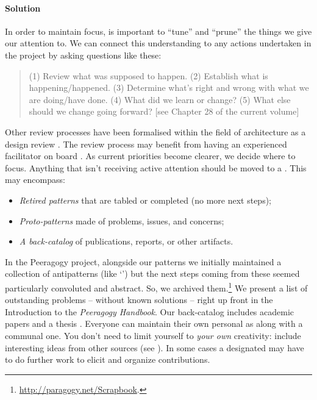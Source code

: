 \begin{refsection}
\paragraph{Solution}
In order to maintain focus, is important to ``tune'' and ``prune'' the
things we give our attention to.  We can connect this understanding to
any actions undertaken in the project by asking questions like these:
\begin{quote}
(1) Review what was supposed to happen.
(2) Establish what is happening/happened.
(3) Determine what’s right and wrong with what we are doing/have done.
(4) What did we learn or change? 
(5) What else should we change going forward?  [see Chapter 28 of the current volume]
\end{quote}
%
Other review processes have been formalised within the field of architecture
as a design review \cite{design-review}.  The review process may benefit from having an experienced
facilitator on board \cite[pp.~67, 142--143]{gabriel2002writer}.
As current priorities become clearer, we decide where to focus.
Anything that isn't receiving active attention should be moved to a
.  This may encompass:
\begin{itemize}
\item \emph{Retired patterns} that are tabled or completed (no more next steps);
\item \emph{Proto-patterns} made of problems, issues, and concerns;
\item \emph{A back-catalog} of publications, reports, or other
  artifacts.
\end{itemize}
In the Peeragogy project, alongside our patterns we initially
maintained a collection of antipatterns (like `') but the next steps coming from these seemed particularly
convoluted and abstract.  So, we archived
them.\footnote{\url{http://paragogy.net/Scrapbook}.}  We present a
list of outstanding problems -- without known solutions -- right up
front in the Introduction to the \emph{Peeragogy Handbook}.  Our back-catalog includes
academic papers
\cite{building-peeragogy-accelerator,corneli2013inaction,corneli2012paragogical,paragogy-okcon}
and a thesis \cite{corneli-thesis}.
%
Everyone can maintain their own personal  as
along with a communal one.  You don't need to limit yourself to
\emph{your own} creativity: include interesting ideas from other
sources (see ). In some cases a
designated  may have to do further work to elicit
and organize contributions.


\end{refsection}
